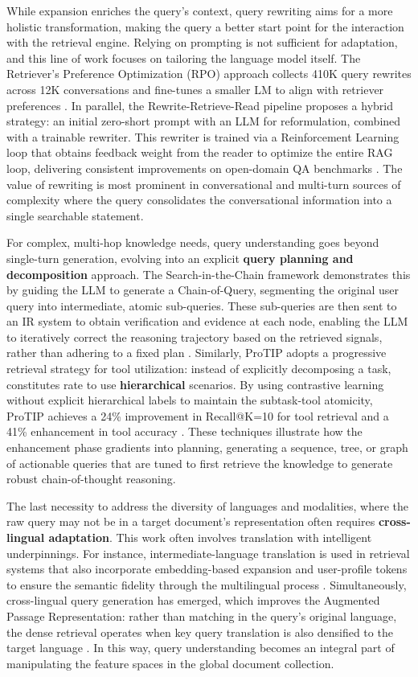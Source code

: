 \documentclass[11pt]{article}
\begin{document}
While expansion enriches the query's context, query rewriting aims for a more holistic transformation, making the query a better start point for the interaction with the retrieval engine. Relying on prompting is not sufficient for adaptation, and this line of work focuses on tailoring the language model itself. The Retriever's Preference Optimization (RPO) approach collects 410K query rewrites across 12K conversations and fine-tunes a smaller LM to align with retriever preferences \cite{ref105}. In parallel, the Rewrite-Retrieve-Read pipeline proposes a hybrid strategy: an initial zero-short prompt with an LLM for reformulation, combined with a trainable rewriter. This rewriter is trained via a Reinforcement Learning loop that obtains feedback weight from the reader to optimize the entire RAG loop, delivering consistent improvements on open-domain QA benchmarks \cite{ref106}. The value of rewriting is most prominent in conversational and multi-turn sources of complexity where the query consolidates the conversational information into a single searchable statement.

For complex, multi-hop knowledge needs, query understanding goes beyond single-turn generation, evolving into an explicit \textbf{query planning and decomposition} approach. The Search-in-the-Chain framework demonstrates this by guiding the LLM to generate a Chain-of-Query, segmenting the original user query into intermediate, atomic sub-queries. These sub-queries are then sent to an IR system to obtain verification and evidence at each node, enabling the LLM to iteratively correct the reasoning trajectory based on the retrieved signals, rather than adhering to a fixed plan \cite{ref107}. Similarly, ProTIP adopts a progressive retrieval strategy for tool utilization: instead of explicitly decomposing a task, constitutes rate to use \textbf{hierarchical} scenarios. By using contrastive learning without explicit hierarchical labels to maintain the subtask-tool atomicity, ProTIP achieves a 24\% improvement in Recall@K=10 for tool retrieval and a 41\% enhancement in tool accuracy \cite{ref108}. These techniques illustrate how the enhancement phase gradients into planning, generating a sequence, tree, or graph of actionable queries that are tuned to first retrieve the knowledge to generate robust chain-of-thought reasoning.

The last necessity to address the diversity of languages and modalities, where the raw query may not be in a target document's representation often requires \textbf{cross-lingual adaptation}. This work often involves translation with intelligent underpinnings. For instance, intermediate-language translation is used in retrieval systems that also incorporate embedding-based expansion and user-profile tokens to ensure the semantic fidelity through the multilingual process \cite{ref109}. Simultaneously, cross-lingual query generation has emerged, which improves the Augmented Passage Representation: rather than matching in the query's original language, the dense retrieval operates when key query translation is also densified to the target language \cite{ref110}. In this way, query understanding becomes an integral part of manipulating the feature spaces in the global document collection.
\end{document}
